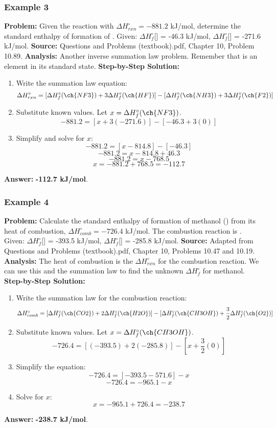 \documentclass{article}
\begin{document}
\subsubsection{Example 3}
\textbf{Problem:} Given the reaction  with $\Delta H_{rxn}^\circ = -881.2$ kJ/mol, determine the standard enthalpy of formation of .
Given: $\Delta H_f^\circ$[] = -46.3 kJ/mol, $\Delta H_f^\circ$[] = -271.6 kJ/mol.
\textbf{Source:} Questions and Problems (textbook).pdf, Chapter 10, Problem 10.89.
\textbf{Analysis:} Another inverse summation law problem. Remember that  is an element in its standard state.
\textbf{Step-by-Step Solution:}
\begin{enumerate}
    \item Write the summation law equation:
    \[ \Delta H_{rxn}^\circ = [\Delta H_f^\circ(\ch{NF3}) + 3\Delta H_f^\circ(\ch{HF})] - [\Delta H_f^\circ(\ch{NH3}) + 3\Delta H_f^\circ(\ch{F2})] \]
    \item Substitute known values. Let $x = \Delta H_f^\circ(\ch{NF3})$.
    \[ -881.2 = [x + 3(-271.6)] - [-46.3 + 3(0)] \]
    \item Simplify and solve for $x$:
    \[ -881.2 = [x - 814.8] - [-46.3] \]
    \[ -881.2 = x - 814.8 + 46.3 \]
    \[ -881.2 = x - 768.5 \]
    \[ x = -881.2 + 768.5 = -112.7 \]
\end{enumerate}
\textbf{Answer:} \textbf{-112.7 kJ/mol}.

\subsubsection{Example 4}
\textbf{Problem:} Calculate the standard enthalpy of formation of methanol () from its heat of combustion, $\Delta H_{comb}^\circ = -726.4$ kJ/mol. The combustion reaction is .
Given: $\Delta H_f^\circ$[] = -393.5 kJ/mol, $\Delta H_f^\circ$[] = -285.8 kJ/mol.
\textbf{Source:} Adapted from Questions and Problems (textbook).pdf, Chapter 10, Problems 10.47 and 10.19.
\textbf{Analysis:} The heat of combustion is the $\Delta H_{rxn}^\circ$ for the combustion reaction. We can use this and the summation law to find the unknown $\Delta H_f^\circ$ for methanol.
\textbf{Step-by-Step Solution:}
\begin{enumerate}
    \item Write the summation law for the combustion reaction:
    \[ \Delta H_{comb}^\circ = [\Delta H_f^\circ(\ch{CO2}) + 2\Delta H_f^\circ(\ch{H2O})] - [\Delta H_f^\circ(\ch{CH3OH}) + \frac{3}{2}\Delta H_f^\circ(\ch{O2})] \]
    \item Substitute known values. Let $x = \Delta H_f^\circ(\ch{CH3OH})$.
    \[ -726.4 = [(-393.5) + 2(-285.8)] - [x + \frac{3}{2}(0)] \]
    \item Simplify the equation:
    \[ -726.4 = [-393.5 - 571.6] - x \]
    \[ -726.4 = -965.1 - x \]
    \item Solve for $x$:
    \[ x = -965.1 + 726.4 = -238.7 \]
\end{enumerate}
\textbf{Answer:} \textbf{-238.7 kJ/mol}.
\end{document}
